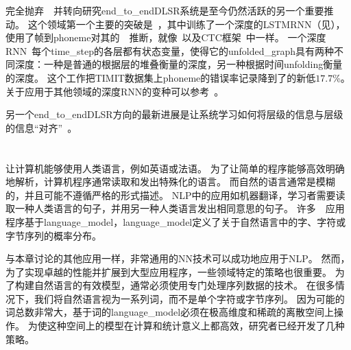 完全抛弃~~并转向研究\gls{end_to_end}\gls{DL}\gls{SR}系统是至今仍然活跃的另一个重要推动。
这个领域第一个主要的突破是~\citet{Graves-et-al-ICASSP2013}，其中训练了一个深度的\gls{LSTM}\gls{RNN}（见），使用了帧到\gls{phoneme}对其的~~推断，就像~\citet{LeCun98-small}以及CTC框架~\citep{Graves-et-al-2006,Graves-book2012}中一样。
一个深度\gls{RNN}~\citep{Graves-et-al-ICASSP2013}每个\gls{time_step}的各层都有状态变量，使得它的\gls{unfolded_graph}具有两种不同深度：一种是普通的根据层的堆叠衡量的深度，另一种根据时间\gls{unfolding}衡量的深度。
这个工作把TIMIT数据集上\gls{phoneme}的错误率记录降到了的新低$17.7$\%。
关于应用于其他领域的深度\gls{RNN}的变种可以参考~\citet{Pascanu-et-al-ICLR2014,Chung-et-al-NIPSDL2014-small}。

另一个\gls{end_to_end}\gls{DL}\gls{SR}方向的最新进展是让系统学习如何将层级的信息与层级的信息``对齐''~\citep{Chorowski-et-al-arxiv2014,llu_is2015b}。


\section{}
\label{sec: natural_language_processing}

让计算机能够使用人类语言，例如英语或法语。
为了让简单的程序能够高效明确地解析，计算机程序通常读取和发出特殊化的语言。
而自然的语言通常是模糊的，并且可能不遵循严格的形式描述。
\gls{NLP}中的应用如机器翻译，学习者需要读取一种人类语言的句子，并用另一种人类语言发出相同意思的句子。
许多~~应用程序基于\gls{language_model}，\gls{language_model}定义了关于自然语言中的字、字符或字节序列的概率分布。


与本章讨论的其他应用一样，非常通用的\gls{NN}技术可以成功地应用于\gls{NLP}。
然而，为了实现卓越的性能并扩展到大型应用程序，一些领域特定的策略也很重要。
为了构建自然语言的有效模型，通常必须使用专门处理序列数据的技术。
在很多情况下，我们将自然语言视为一系列词，而不是单个字符或字节序列。
因为可能的词总数非常大，基于词的\gls{language_model}必须在极高维度和稀疏的离散空间上操作。
为使这种空间上的模型在计算和统计意义上都高效，研究者已经开发了几种策略。

\subsection{}
\label{sec:n_grams}

